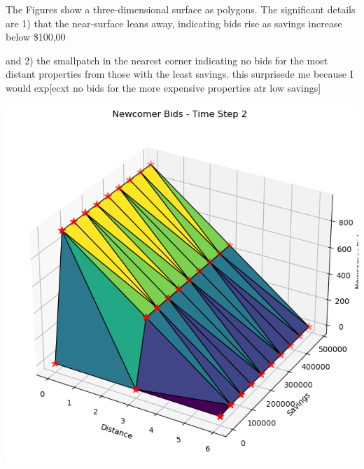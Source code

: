 The Figures show a  three-dimensional surface as polygons. The significant details are  1) that the near-surface leans away, indicating bids rise as savings increase below \$100,00

and 2) the smallpatch in the nearest corner indicating no bids for the most distant properties from those with the least savings. this surprisede me because I would exp[ecxt no bids for the more expensive properties atr low savings]
 

\includegraphics[scale=.9]{fig/Analysis/Savings-distanc-bids.png}





